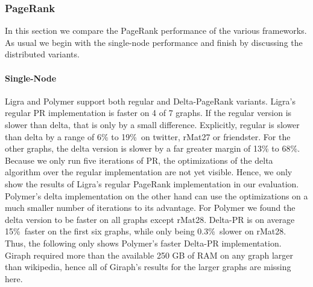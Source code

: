 

\subsubsection{PageRank}
In this section we compare the PageRank performance of the various frameworks. As usual we begin with the single-node performance and finish by discussing the distributed variants.

\paragraph{Single-Node}
Ligra and Polymer support both regular and Delta-PageRank variants.
Ligra's regular PR implementation is faster on 4 of 7 graphs. If the regular version is slower than delta, that is only by a small difference. Explicitly, regular is slower than delta by a range of 6\% to 19\%\ on twitter, rMat27 or friendster. For the other graphs, the delta version is slower by a far greater margin of 13\% to 68\%. Because we only run five iterations of PR, the optimizations of the delta algorithm over the regular implementation are not yet visible.
Hence, we only show the results of Ligra's regular PageRank implementation in our evaluation.
Polymer's delta implementation on the other hand can use the optimizations on a much smaller number of iterations to its advantage. For Polymer we found the delta version to be faster on all graphs except rMat28. Delta-PR is on average 15\%\ faster on the first six graphs, while only being 0.3\%\ slower on rMat28. 
Thus, the following only shows Polymer's faster Delta-PR implementation.
Giraph required more than the available 250 GB of RAM on any graph larger than wikipedia, hence all of Giraph's results for the larger graphs are missing here.
